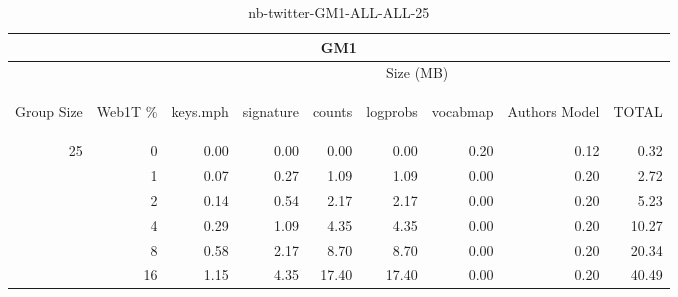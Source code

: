 \begin{center}
\begin{table}[htbp]
\begin{tabular}{ | r | r | r | r | r | r | r | r | r |}
\hline
\multicolumn{9}{|c|}{GM1}\\
\hline
 & & \multicolumn{7}{|c|}{Size (MB)}\\ \cline{3-9}
\begin{sideways}Group Size\end{sideways} & \begin{sideways}Web1T \% \end{sideways} & \begin{sideways}keys.mph\end{sideways} & \begin{sideways}signature\end{sideways} & \begin{sideways}counts\end{sideways} & \begin{sideways}logprobs\end{sideways} & \begin{sideways}vocabmap\end{sideways} & \begin{sideways}Authors Model \end{sideways} & \begin{sideways}TOTAL\end{sideways}\\
\hline
\multirow{5}{*}{25}
 & 0 & 0.00 & 0.00 & 0.00 & 0.00 & 0.20 & 0.12 & 0.32\\ \cline{2-9}
 & 1 & 0.07 & 0.27 & 1.09 & 1.09 & 0.00 & 0.20 & 2.72\\ \cline{2-9}
 & 2 & 0.14 & 0.54 & 2.17 & 2.17 & 0.00 & 0.20 & 5.23\\ \cline{2-9}
 & 4 & 0.29 & 1.09 & 4.35 & 4.35 & 0.00 & 0.20 & 10.27\\ \cline{2-9}
 & 8 & 0.58 & 2.17 & 8.70 & 8.70 & 0.00 & 0.20 & 20.34\\ \cline{2-9}
 & 16 & 1.15 & 4.35 & 17.40 & 17.40 & 0.00 & 0.20 & 40.49\\ \cline{2-9}
\hline
\end{tabular}
\caption{nb-twitter-GM1-ALL-ALL-25}
\label{table:nb-twitter-GM1-ALL-ALL-25}
\end{table}
\end{center}

